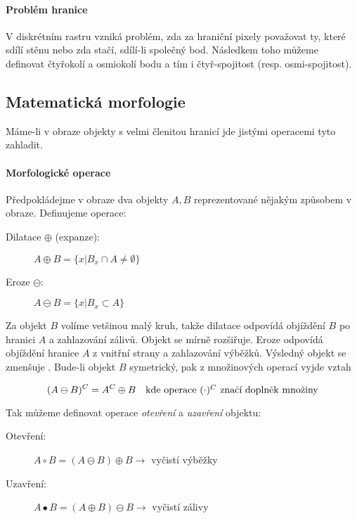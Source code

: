 \paragraph{Problém hranice}
V diskrétním rastru vzniká problém, zda za hraniční pixely považovat ty, které sdílí stěnu nebo zda stačí, sdílí-li 
společný bod. Následkem toho můžeme definovat čtyřokolí a osmiokolí bodu a tím i čtyř-spojitost (resp. osmi-spojitost).


\subsection{Matematická morfologie}
Máme-li v obraze objekty s velmi členitou hranicí jde jistými operacemi tyto  zahladit.

\paragraph{Morfologické operace}
Předpokládejme v obraze dva objekty $A,B$ reprezentované nějakým způsobem v obraze. Definujeme operace:
\begin{description}
\item[Dilatace $\oplus$ (expanze):] $A\oplus B=\{x|B_x\cap A\neq \emptyset\}$
\item[Eroze $\ominus$:] $A\ominus B=\{x|B_x\subset A\}$
\end{description}

Za objekt $B$ volíme vetšinou malý kruh, takže dilatace odpovídá objíždění $B$  po hranici $A$ a zahlazování zálivů.
Objekt se mírně rozšiřuje. Eroze odpovídá objíždění hranice $A$ z vnitřní strany a zahlazování výběžků. Výsledný objekt
se zmenšuje .
Bude-li objekt $B$ symetrický, pak z množinových operací vyjde vztah

\begin{equation}
(A\ominus B)^C=A^C\oplus B\quad\hbox{kde operace $(\cdot)^C$ značí doplněk množiny}
\end{equation}

Tak můžeme definovat operace {\em otevření} a {\em uzavření} objektu:
\begin{description}
\item[Otevření:] $A\circ B=(A\ominus B)\oplus B$\quad$\rightarrow$ vyčistí výběžky
\item[Uzavření:] $A\bullet B=(A\oplus B)\ominus B$\quad$\rightarrow$ vyčistí zálivy
\end{description}

